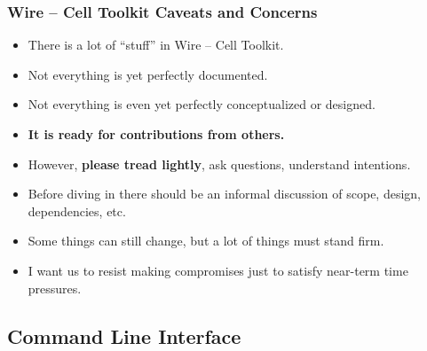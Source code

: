 \documentclass[xcolor=dvipsnames]{beamer}
\def\wct{Wire -- Cell Toolkit\xspace}
\begin{document}
\begin{frame}
\end{frame}

\begin{frame}
  \frametitle{\wct Caveats and Concerns}

  \footnotesize
  \begin{itemize}
  \item There is a lot of ``stuff'' in \wct.
  \item Not everything  is yet perfectly documented.
  \item Not everything is even yet perfectly conceptualized or
    designed.
  \item \textbf{It is ready for contributions from others.}
  \item However, \textbf{please tread lightly}, ask questions,
    understand intentions.  
  \item Before diving in there should be an informal discussion of scope,
    design, dependencies, etc.
  \item Some things can still change, but a lot of things must stand
    firm.
  \item I want us to resist making compromises just to satisfy
    near-term time pressures.
  \end{itemize}

  \vfill
\end{frame}

\subsection{Command Line Interface}

\begin{frame}
  \tableofcontents[
  currentsection,
  currentsubsection,        
  subsectionstyle=show/shaded/hide]
\end{frame}
\end{document}
